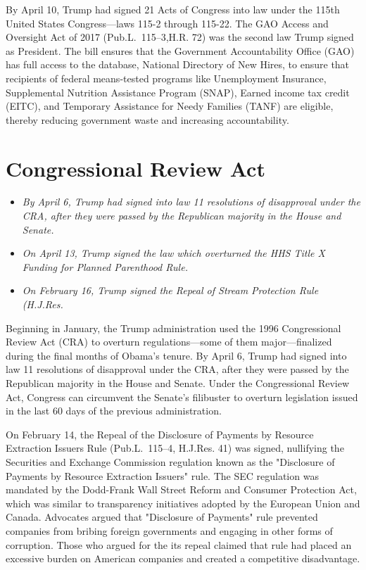 By April 10, Trump had signed 21 Acts of Congress into law under the
115th United States Congress---laws 115-2 through 115-22. The GAO Access
and Oversight Act of 2017 (Pub.L.~115--3,H.R. 72) was the second law
Trump signed as President. The bill ensures that the Government
Accountability Office (GAO) has full access to the database, National
Directory of New Hires, to ensure that recipients of federal
means-tested programs like Unemployment Insurance, Supplemental
Nutrition Assistance Program (SNAP), Earned income tax credit (EITC),
and Temporary Assistance for Needy Families (TANF) are eligible, thereby
reducing government waste and increasing accountability.

\section{Congressional Review Act}\label{congressional-review-act}

\begin{itemize}
\item
  \emph{By April 6, Trump had signed into law 11 resolutions of
  disapproval under the CRA, after they were passed by the Republican
  majority in the House and Senate.}
\item
  \emph{On April 13, Trump signed the law which overturned the HHS Title
  X Funding for Planned Parenthood Rule.}
\item
  \emph{On February 16, Trump signed the Repeal of Stream Protection
  Rule (H.J.Res.}
\end{itemize}

Beginning in January, the Trump administration used the 1996
Congressional Review Act (CRA) to overturn regulations---some of them
major---finalized during the final months of Obama's tenure. By April 6,
Trump had signed into law 11 resolutions of disapproval under the CRA,
after they were passed by the Republican majority in the House and
Senate. Under the Congressional Review Act, Congress can circumvent the
Senate's filibuster to overturn legislation issued in the last 60 days
of the previous administration.

On February 14, the Repeal of the Disclosure of Payments by Resource
Extraction Issuers Rule (Pub.L.~115--4, H.J.Res. 41) was signed,
nullifying the Securities and Exchange Commission regulation known as
the "Disclosure of Payments by Resource Extraction Issuers" rule. The
SEC regulation was mandated by the Dodd-Frank Wall Street Reform and
Consumer Protection Act, which was similar to transparency initiatives
adopted by the European Union and Canada. Advocates argued that
"Disclosure of Payments" rule prevented companies from bribing foreign
governments and engaging in other forms of corruption. Those who argued
for the its repeal claimed that rule had placed an excessive burden on
American companies and created a competitive disadvantage.

